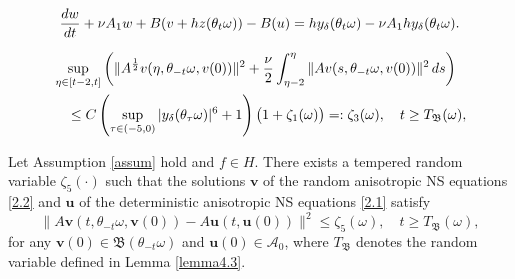 \documentclass[10pt,a4paper]{amsart}
\renewcommand{\d}{{\rm{d}}}
\begin{document}
\begin{align}\label{4.8}
\frac{\d w}{\d t}+ \nu  A_1w+B( \textbf{v}+hz(\theta_t\omega))-B(\textbf{u}) = hy_\delta(\theta_t\omega) - \nu A_1hy_\delta(\theta_t\omega).
\end{align}

\begin{align}
 &\sup_{\eta\in [t-2,t]}
  \left(
 \|A^{\frac12}\textbf{v} (\eta ,\theta_{-t } \omega, \textbf{v}(0)) \|^2
 + \frac{\nu}{2} \int_{\eta-2}^\eta  \|A\textbf{v} (s,\theta_{-t} \omega, \textbf{v}(0)) \|^2 \, \d s\right) \notag  \\
& \quad \leq  C\left (  \sup_{\tau\in (-5,0)}|y_\delta(\theta_\tau\omega)|^6+1\right)\big(1
 +   \zeta_1(\omega)   \big)
 =:  \zeta_3(\omega) ,\quad t\geq T_{\mathfrak B} (\omega) ,\label{mar8.3}
\end{align}

\begin{lemma}[$H^2$-distance] \label{lem:H2bd}  Let Assumption \ref{assum} hold and $f\in H$.
There exists a tempered random variable $\zeta_5(\cdot)$ such that the solutions $\textbf{v}$ of the random anisotropic NS equations \eqref{2.2} and $\textbf{u}$  of the deterministic anisotropic NS equations  \eqref{2.1} satisfy
\[
 \|A\textbf{v}(t,\theta_{-t}\omega,\textbf{v}(0))-A\textbf{u}(t,\textbf{u}(0))\|^2\leq \zeta_5(\omega),
\quad t\geq T_{\mathfrak B}(\omega),
\]
for any $\textbf{v}(0)\in\mathfrak{B}(\theta_{-t}\omega)$
 and $\textbf{u}(0)\in\mathcal{A}_0$,
where $T_{\mathfrak B}$ denotes the random variable defined in  Lemma \ref{lemma4.3}.
\end{lemma}
\end{document}
